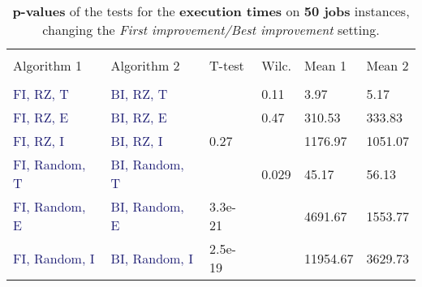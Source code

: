 \documentclass[
12pt,
a4paper,
oneside,
headinclude,
footinclude]{article}
\theoremstyle{definition} %
\begin{document}
\begin{table}[H]
    \begin{tabular}{l l l l l l} %
        \hline
        \hline 
        \\[-1.5ex]
        \textcolor{BrickRed}{Algorithm 1} & \textcolor{BrickRed}{Algorithm 2} & \textcolor{BrickRed}{T-test} & \textcolor{BrickRed}{Wilc.} & \textcolor{BrickRed}{Mean 1} & \textcolor{BrickRed}{Mean 2}\\ [0.5ex]
        \hline %
        \\[-1.5ex]
        \textcolor{MidnightBlue}{FI, RZ, T}     & \textcolor{MidnightBlue}{BI, RZ, T}     &  & 0.11 &   3.97 & 5.17 \\ 
        \textcolor{MidnightBlue}{FI, RZ, E}     & \textcolor{MidnightBlue}{BI, RZ, E}     &  & 0.47 &   310.53 & 333.83 \\ 
        \textcolor{MidnightBlue}{FI, RZ, I}     & \textcolor{MidnightBlue}{BI, RZ, I}     & 0.27 &  &  1176.97 & 1051.07 \\ 
        \textcolor{MidnightBlue}{FI, Random, T} & \textcolor{MidnightBlue}{BI, Random, T} &  & 0.029 &  45.17 & 56.13 \\ 
        \textcolor{MidnightBlue}{FI, Random, E} & \textcolor{MidnightBlue}{BI, Random, E} & 3.3e-21 &  &  4691.67 & 1553.77 \\ 
        \textcolor{MidnightBlue}{FI, Random, I} & \textcolor{MidnightBlue}{BI, Random, I} & 2.5e-19 &  &  11954.67 & 3629.73 \\ 
        [1ex] %
        \hline %
    \end{tabular}
    \caption{\label{tab:ii-ty50ex}\textbf{p-values} of the tests for the \textbf{execution times} on \textbf{50 jobs} instances, changing the \textit{First improvement/Best improvement} setting.}
\end{table} 
\end{document}
